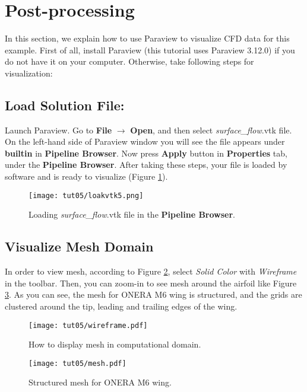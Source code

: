 \section{Post-processing}
In this section, we explain how to use Paraview to visualize CFD data for this example. First of all, install Paraview (this tutorial uses Paraview 3.12.0) if you do not have it on your computer. Otherwise, take following steps for visualization:
\subsection{Load Solution File:}
Launch Paraview. Go to \textbf{File} $\rightarrow$ \textbf{Open}, and then select \textit{surface\_flow}.vtk file. On the left-hand side of Paraview window you will see the file appears under \textbf{builtin} in \textbf{Pipeline Browser}. Now press \textbf{Apply} button in \textbf{Properties} tab, under the  \textbf{Pipeline Browser}. After taking these steps, your file is loaded by software and is ready to visualize (Figure \ref{fig5:load}).
\begin{figure}[htbp]
    \centering
    \texttt{[image: tut05/loakvtk5.png]}
    \caption{Loading \textit{surface\_flow}.vtk file in the \textbf{Pipeline Browser}.}
    \label{fig5:load}
\end{figure}
\subsection{Visualize Mesh Domain}
In order to view mesh, according to Figure \ref{fig5:wireframe}, select \textit{Solid Color} with \textit{Wireframe} in the toolbar. Then, you can zoom-in to see mesh around the airfoil like Figure \ref{fig5:mesh}. As you can see, the mesh for ONERA M6 wing is structured, and the grids are clustered around the tip, leading and trailing edges of the wing.
\begin{figure}[htbp]
    \centering
    \texttt{[image: tut05/wireframe.pdf]}
    \caption{How to display mesh in computational domain.}
    \label{fig5:wireframe}
\end{figure}
\begin{figure}[htbp]
    \centering
    \texttt{[image: tut05/mesh.pdf]}
    \caption{Structured mesh for ONERA M6 wing.}
    \label{fig5:mesh}
\end{figure}
